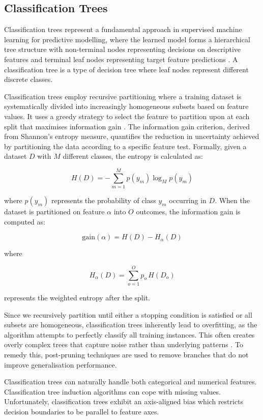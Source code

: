 \documentclass[10pt, conference]{IEEEtran}
\begin{document}
\subsection{Classification Trees}
Classification trees represent a fundamental approach in supervised machine learning for predictive modelling, where the learned model forms a hierarchical tree structure with non-terminal nodes representing decisions on descriptive features and terminal leaf nodes representing target feature predictions \cite{quinlan1993c45}. A classification tree is a type of decision tree where leaf nodes represent different discrete classes.

Classification trees employ recursive partitioning where a training dataset is systematically divided into increasingly homogeneous subsets based on feature values. It uses a greedy strategy to select the feature to partition upon at each split that maximises information gain \cite{kelleher2020fundamentals}. The information gain criterion, derived from Shannon's entropy measure, quantifies the reduction in uncertainty achieved by partitioning the data according to a specific feature test.
Formally, given a dataset $D$ with $M$ different classes, the entropy is calculated as:

\[
H(D) = -\sum_{m=1}^{M} p(y_m) \log_{M} p(y_m)
\]

where $p(y_m)$ represents the probability of class $y_m$ occurring in $D$. When the dataset is partitioned on feature $\alpha$ into $O$ outcomes, the information gain is computed as:

\[
\text{gain}(\alpha) = H(D) - H_\alpha(D)
\]

where 

\[
H_\alpha(D) = \sum_{o=1}^{O} p_o \, H(D_o)
\]

represents the weighted entropy after the split.

Since we recursively partition until either a stopping condition is satisfied or all subsets are homogeneous, classification trees inherently lead to overfitting, as the algorithm attempts to perfectly classify all training instances. This often creates overly complex trees that capture noise rather than underlying patterns \cite{quinlan1993c45}. To remedy this, post-pruning techniques are used to remove branches that do not improve generalisation performance.

Classification trees can naturally handle both categorical and numerical features. Classification tree induction algorithms can cope with missing values. Unfortunately, classification trees exhibit an axis-aligned bias which restricts decision boundaries to be parallel to feature axes.
\end{document}
